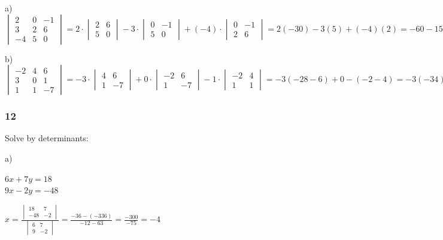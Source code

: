 \documentclass[]{report}
\begin{document}
a) $
\begin{vmatrix}
2 & 0 & -1 \\
3 & 2 & 6 \\
-4 & 5 & 0
\end{vmatrix}=
 2 \cdot \begin{vmatrix}
2 & 6\\
5 & 0
\end{vmatrix}
- 3\cdot \begin{vmatrix}
0 & -1\\
5 & 0
\end{vmatrix}
+ (-4)\cdot \begin{vmatrix}
0 & -1 \\
2&6
\end{vmatrix}
=2(-30) - 3(5) + (-4)(2) = -60 -15  - 8 = -83
$


b)$
\begin{vmatrix}
-2 & 4 & 6 \\
3 & 0 & 1 \\
1 & 1 & -7
\end{vmatrix}= - 3\cdot \begin{vmatrix}
4 & 6 \\
1 & -7
\end{vmatrix}
+ 0 \cdot \begin{vmatrix}
-2 & 6\\
1 & -7
\end{vmatrix}
- 1\cdot \begin{vmatrix}
-2 & 4\\
1 & 1
\end{vmatrix}= - 3(-28 - 6) + 0 - (-2 -4) = - 3(-34) - (-6) = - (-102) - (-6) = 108
$

\subsubsection{12}

Solve by determinants:

a)

$6x + 7y = 18$ \\
$9x - 2y = -48$

$x = \frac{
\begin{vmatrix}
18  & 7\\
-48 & -2
\end{vmatrix}
}{
\begin{vmatrix}
6 & 7 \\
9 & -2
\end{vmatrix}
} = \frac{-36 - (-336)}{-12 - 63} = \frac{-300}{-75} = -4$
\end{document}
